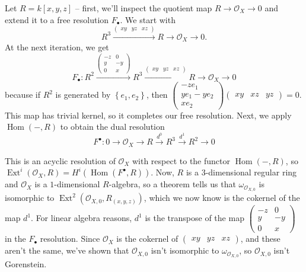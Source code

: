 \documentclass[11pt]{article}
\DeclareMathOperator{\Hom}{Hom}
\DeclareMathOperator{\Ext}{Ext}
\begin{document}
    Let \(R = k[x,y,z]\) -- first, we'll inspect the quotient map \(R \to \mathcal{O}_X \to 0\) and extend it to a free resolution \(F_\bullet\). We start with \[R^3 \xrightarrow{\begin{pmatrix}
    xy & yz & xz
    \end{pmatrix}} R \to \mathcal{O}_X \to 0.\] At the next iteration, we get \[F_\bullet: R^2 \xrightarrow{\begin{pmatrix}
        -z & 0\\
        y & -y\\
        0 & x
    \end{pmatrix}} R^3 \xrightarrow{\begin{pmatrix}
    xy & yz & xz
    \end{pmatrix}} R \to \mathcal{O}_X \to 0\]
    because if \(R^2\) is generated by \(\left\{e_1, e_2\right\}\), then \(\begin{pmatrix}
        -ze_1\\
        ye_1 -ye_2\\
        xe_2
    \end{pmatrix}\begin{pmatrix}
        xy & xz & yz
    \end{pmatrix} = 0\). This map has trivial kernel, so it completes our free resolution. Next, we apply \(\Hom(-,R)\) to obtain the dual resolution \[F^\bullet: 0 \to \mathcal{O}_X \to R \xrightarrow{d^0} R^3 \xrightarrow{d^1} R^2 \to 0\]

    This is an acyclic resolution of \(\mathcal{O}_X\) with respect to the functor \(\Hom(-,R)\), so \(\Ext^i(\mathcal{O}_X, R) = H^i(\Hom(F^\bullet, R))\). Now, \(R\) is a \(3\)-dimensional regular ring and \(\mathcal{O}_X\) is a \(1\)-dimensional \(R\)-algebra, so a theorem\autocite[.7]{BH98} tells us that \(\omega_{\mathcal{O}_{X,0}}\) is isomorphic to \(\Ext^2(\mathcal{O}_{X,0}, R_{(x,y,z)})\), which we now know is the cokernel of the map \(d^1\). For linear algebra reasons, \(d^1\) is the transpose of the map \(\begin{pmatrix}
        -z & 0\\
        y & -y\\
        0 & x
    \end{pmatrix}\) in the \(F_\bullet\) resolution. Since \(\mathcal{O}_X\) is the cokernel of \(\begin{pmatrix}
    xy & yz & xz
    \end{pmatrix}\), and these aren't the same, we've shown that \(\mathcal{O}_{X,0}\) isn't isomorphic to \(\omega_{\mathcal{O}_{X,0}}\), so \(\mathcal{O}_{X,0}\) isn't Gorenstein.
\end{document}
